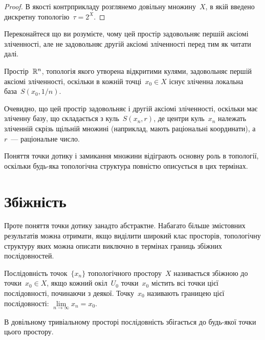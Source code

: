 \begin{proof}
    В якості контрприкладу розглянемо довільну  множину~$X$, в якій введено дискретну топологію~$\tau = 2^X$.
\end{proof}

\begin{exercise}
    Переконайтеся що ви розумієте, чому цей простір задовольняє першій аксіомі зліченності, але не задовольняє другій аксіомі зліченності перед тим як читати далі.
\end{exercise}

\begin{example}
    Простір~$\mathbb{R}^n$, топологія якого утворена відкритими кулями, задовольняє першій аксіомі зліченності, оскільки в кожній точці~$x_0 \in X$ існує зліченна локальна база~$S(x_0, 1 / n)$.

    Очевидно, що цей простір задовольняє і другій аксіомі зліченності, оскільки має зліченну базу, що складається з куль~$S(x_n, r)$, де центри куль~$x_n$ належать зліченній скрізь щільній множині (наприклад, мають раціональні координати), а~$r$~--- раціональне число.
\end{example}

Поняття точки дотику і замикання множини відіграють основну роль в топології, оскільки будь-яка топологічна структура повністю описується в цих термінах.

\section{Збіжність}

Проте поняття точки дотику занадто абстрактне. Набагато більше змістовних результатів можна отримати, якщо виділити широкий клас просторів, топологічну структуру яких можна описати виключно в термінах границь збіжних послідовностей.

\begin{definition}
    Послідовність точок~$\{x_n\}$ топологічного простору~$X$ називається збіжною до точки~$x_0 \in X$, якщо кожний окіл~$U_0$ точки~$x_0$ містить всі точки цієї послідовності, починаючи з деякої. Точку~$x_0$ називають границею цієї послідовності: $\lim\limits_{n \to \infty} x_n = x_0$.
\end{definition}

\begin{example}
    В довільному тривіальному просторі послідовність збігається до будь-якої точки цього простору.
\end{example}

